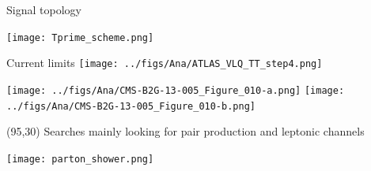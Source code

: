 \begin{frame}{Signal topology}
\vspace{-.2cm}
\begin{center}
    \texttt{[image: Tprime\_scheme.png]}
  \end{center}
\end{frame}



\begin{frame}{Current limits}
\vspace{-.2cm}
\texttt{[image: ../figs/Ana/ATLAS\_VLQ\_TT\_step4.png]}\\
\begin{center}
\texttt{[image: ../figs/Ana/CMS-B2G-13-005\_Figure\_010-a.png]}
\texttt{[image: ../figs/Ana/CMS-B2G-13-005\_Figure\_010-b.png]}
  \end{center}
\begin{textblock}{25}(95,30)\scriptsize
Searches mainly looking for pair production and leptonic channels 
\end{textblock}

\end{frame}







\iffalse
\begin{frame}{}
\vspace{-.2cm}
\begin{center}
    \texttt{[image: parton\_shower.png]}
  \end{center}
\end{frame}


